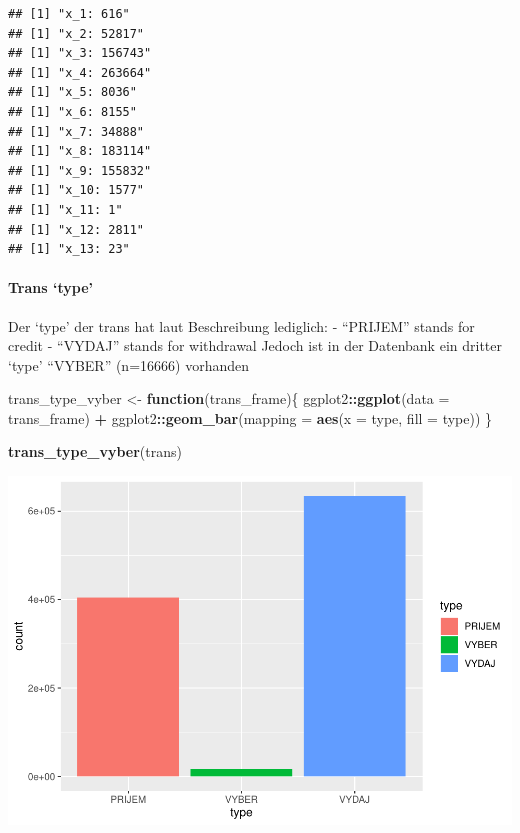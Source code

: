 \documentclass[]{article}
\newenvironment{Shaded}{\begin{snugshade}}{\end{snugshade}}
\newcommand{\ControlFlowTok}[1]{\textcolor[rgb]{0.13,0.29,0.53}{\textbf{#1}}}
\newcommand{\DataTypeTok}[1]{\textcolor[rgb]{0.13,0.29,0.53}{#1}}
\newcommand{\KeywordTok}[1]{\textcolor[rgb]{0.13,0.29,0.53}{\textbf{#1}}}
\newcommand{\NormalTok}[1]{#1}
\newcommand{\OperatorTok}[1]{\textcolor[rgb]{0.81,0.36,0.00}{\textbf{#1}}}
\newcommand{\StringTok}[1]{\textcolor[rgb]{0.31,0.60,0.02}{#1}}
\let\oldparagraph\paragraph
\renewcommand{\paragraph}[1]{\oldparagraph{#1}\mbox{}}
\begin{document}
\begin{verbatim}
## [1] "x_1: 616"
## [1] "x_2: 52817"
## [1] "x_3: 156743"
## [1] "x_4: 263664"
## [1] "x_5: 8036"
## [1] "x_6: 8155"
## [1] "x_7: 34888"
## [1] "x_8: 183114"
## [1] "x_9: 155832"
## [1] "x_10: 1577"
## [1] "x_11: 1"
## [1] "x_12: 2811"
## [1] "x_13: 23"
\end{verbatim}

\hypertarget{trans-type}{%
\paragraph{Trans `type'}\label{trans-type}}

Der `type' der trans hat laut Beschreibung lediglich: - ``PRIJEM''
stands for credit - ``VYDAJ'' stands for withdrawal Jedoch ist in der
Datenbank ein dritter `type' ``VYBER'' (n=16666) vorhanden

\begin{Shaded}
\begin{Highlighting}[]
\NormalTok{trans_type_vyber <-}\StringTok{ }\ControlFlowTok{function}\NormalTok{(trans_frame)\{}
\NormalTok{  ggplot2}\OperatorTok{::}\KeywordTok{ggplot}\NormalTok{(}\DataTypeTok{data =}\NormalTok{ trans_frame) }\OperatorTok{+}\StringTok{ }
\StringTok{    }\NormalTok{ggplot2}\OperatorTok{::}\KeywordTok{geom_bar}\NormalTok{(}\DataTypeTok{mapping =} \KeywordTok{aes}\NormalTok{(}\DataTypeTok{x =}\NormalTok{ type, }\DataTypeTok{fill =}\NormalTok{ type))}
\NormalTok{\}}

\KeywordTok{trans_type_vyber}\NormalTok{(trans)}
\end{Highlighting}
\end{Shaded}

\includegraphics{analysis_gehrig_files/figure-latex/unnamed-chunk-6-1.pdf}
\end{document}
